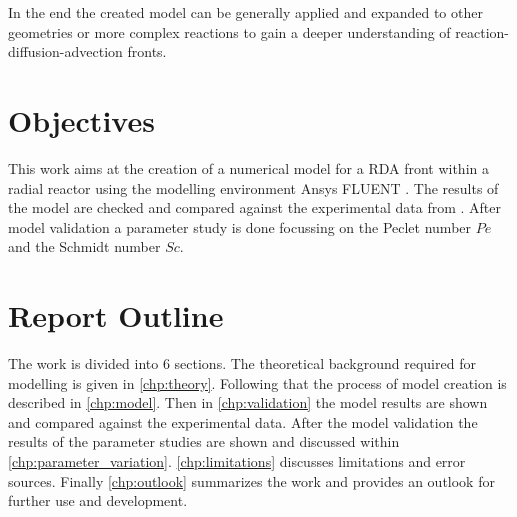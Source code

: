 \documentclass[../thesis.tex]{subfiles}
\begin{document}
In the end the created model can be generally applied and expanded to other geometries or more complex reactions to gain a deeper understanding of reaction-diffusion-advection fronts. 

\section{Objectives}

This work aims at the creation of a numerical model for a RDA front within a radial reactor using the modelling environment Ansys FLUENT \cite{}. The results of the model are checked and compared against the experimental data from \cite{stergiou2022effects}. After model validation a parameter study is done focussing on the Peclet number $Pe$ and the Schmidt number $Sc$.


\section{Report Outline}

The work is divided into 6 sections. The theoretical background required for modelling is given in \autoref{chp:theory}. Following that the process of model creation is described in \autoref{chp:model}. Then in \autoref{chp:validation} the model results are shown and compared against the experimental data. After the model validation the results of the parameter studies are shown and discussed within \autoref{chp:parameter_variation}. \autoref{chp:limitations} discusses limitations and error sources. Finally \autoref{chp:outlook} summarizes the work and provides an outlook for further use and development.
\end{document}
